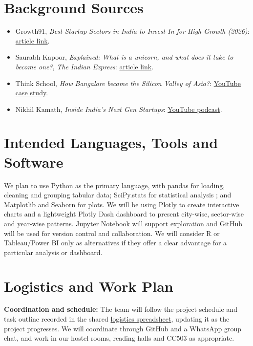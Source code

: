 \documentclass[10pt,a4paper]{article}
\begin{document}
\section{Background Sources}
\begin{itemize}
  \item Growth91, \textit{Best Startup Sectors in India to Invest In for High Growth (2026)}: \href{https://growth91.com/blog/best-startup-sectors-india-invest-high-growth-2026/}{article link}.
  \item Saurabh Kapoor, \textit{Explained: What is a unicorn, and what does it take to become one?}, \textit{The Indian Express}: \href{https://indianexpress.com/article/explained/everyday-explainers/explained-what-is-a-unicorn-and-what-does-it-take-to-become-one-7944468/}{article link}.
  \item Think School, \textit{How Bangalore became the Silicon Valley of Asia?}: \href{https://youtu.be/cjhlcIOgUy4}{YouTube case study}.
  \item Nikhil Kamath, \textit{Inside India's Next Gen Startups}: \href{https://youtu.be/yFyIBKK361E}{YouTube podcast}.
\end{itemize}

\section{Intended Languages, Tools and Software}
We plan to use Python as the primary language, with pandas for loading, cleaning and grouping tabular data;
SciPy.stats for  statistical analysis ; and Matplotlib and Seaborn for plots. We will be using Plotly to create interactive charts and a lightweight Plotly
Dash dashboard to present city-wise, sector-wise and year-wise patterns. Jupyter Notebook will support exploration and GitHub will be used for version control and collaboration. We will consider R or
Tableau/Power BI only as alternatives if they offer a clear advantage for a particular analysis or dashboard.

\section{Logistics and Work Plan}
\textbf{Coordination and schedule:} The team will follow the project schedule and task outline recorded in the shared \href{https://docs.google.com/spreadsheets/d/1rOHg7PRTUyQhNcKS4sHRMWOS8t5IsXoPo_IaoyhDdhA/edit?usp=sharing}{logistics spreadsheet}, updating it as the project progresses. We will coordinate through GitHub and a WhatsApp group chat, and work in our hostel rooms, reading halls and CC503 as appropriate.
\end{document}
